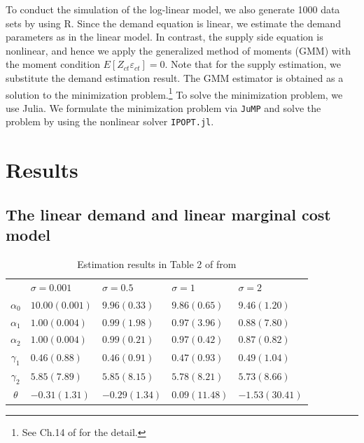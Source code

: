 \documentclass[11pt, a4paper]{article}
\begin{document}
To conduct the simulation of the log-linear model, we also generate 1000 data sets by using R. 
Since the demand equation is linear, we estimate the demand parameters as in the linear model.
In contrast, the supply side equation is nonlinear, and hence we apply the generalized method of moments (GMM) with the moment condition $E[Z_{ct} \varepsilon_{ct}] = 0$.
Note that for the supply estimation, we substitute the demand estimation result.
The GMM estimator is obtained as a solution to the minimization problem.\footnote{See Ch.14 of \citet{wooldridge2010econometric} for the detail.}
To solve the minimization problem, we use Julia.
We formulate the minimization problem via \texttt{JuMP} and solve the problem by using the nonlinear solver \texttt{IPOPT.jl}.



\section{Results}

\subsection{The linear demand and linear marginal cost model}

\begin{table}[!htbp]
    \centering
    \caption{Estimation results in Table 2 of from \cite{perloff2012collinearity}}
    \label{tb:linear_linear_sigma_Perloff_Shen} 
        \begin{tabular}{cllll}
            \hline\hline
            & $\sigma=0.001$ & $\sigma=0.5$ & $\sigma=1$ & $\sigma=2$ \\
            $\alpha_0$ & $10.00(0.001)$ & $9.96(0.33)$ & $9.86(0.65)$ & $9.46(1.20)$ \\
            $\alpha_1$ & $1.00(0.004)$ & $0.99(1.98)$ & $0.97(3.96)$ & $0.88(7.80)$ \\
            $\alpha_2$ & $1.00(0.004)$ & $0.99(0.21)$ & $0.97(0.42)$ & $0.87(0.82)$ \\
            $\gamma_1$ & $0.46(0.88)$ & $0.46(0.91)$ & $0.47(0.93)$ & $0.49(1.04)$ \\
            $\gamma_2$ & $5.85(7.89)$ & $5.85(8.15)$ & $5.78(8.21)$ & $5.73(8.66)$ \\
            $\theta$ & $-0.31(1.31)$ & $-0.29(1.34)$ & $0.09(11.48)$ & $-1.53(30.41)$ \\
            \hline
        \end{tabular}
\end{table}
\end{document}

